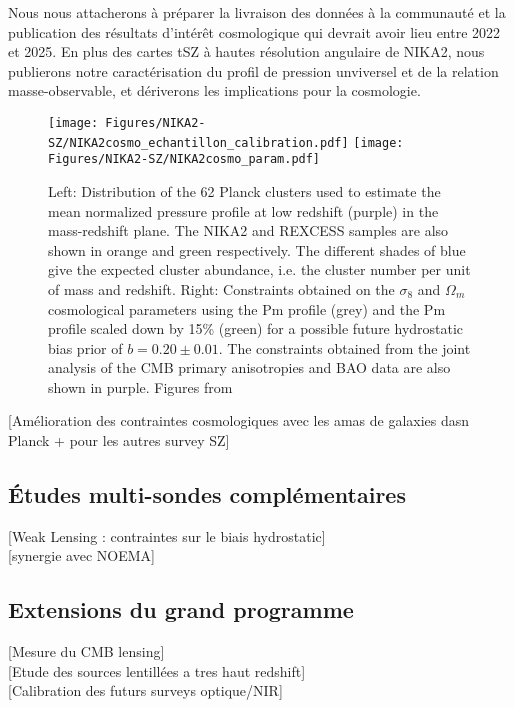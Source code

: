 Nous nous attacherons à préparer la livraison des données à la
communauté et la publication des résultats d'intérêt cosmologique qui
devrait avoir lieu entre 2022 et 2025. En plus des cartes tSZ à hautes
résolution angulaire de NIKA2, nous publierons notre caractérisation
du profil de pression unviversel et de la relation masse-observable,
et dériverons les implications pour la cosmologie.
%
\begin{figure}
  \centering
  \texttt{[image: Figures/NIKA2-SZ/NIKA2cosmo\_echantillon\_calibration.pdf]}
  \texttt{[image: Figures/NIKA2-SZ/NIKA2cosmo\_param.pdf]}
  \caption{Left: Distribution of the 62 Planck clusters used to
    estimate the mean normalized pressure profile at low redshift
    (purple) in the mass-redshift plane. The NIKA2 and REXCESS samples
    are also shown in orange and green respectively.
    The different shades of blue give the expected cluster abundance,
i.e. the cluster number per unit of mass and redshift. Right:
Constraints obtained on the $\sigma_8$ and $\Omega_m$ cosmological
parameters using the Pm profile (grey) and the Pm profile scaled down
by 15\% (green) for a possible future hydrostatic bias prior of $b = 0.20
\pm 0.01$. The constraints obtained from the joint analysis of the CMB
primary anisotropies and BAO data are also shown in purple. Figures
from~\citet{Ruppin2019b}}
  \label{fig:nika2cosmo}
\end{figure}
%

[Amélioration des contraintes cosmologiques avec les amas de galaxies
  dasn Planck + pour les autres survey SZ]\\

\subsection{\'Etudes multi-sondes complémentaires}

[Weak Lensing : contraintes sur le biais hydrostatic]\\

[synergie avec NOEMA]\\

\subsection{Extensions du grand programme}

[Mesure du CMB lensing]\\

[Etude des sources lentillées a tres haut redshift]\\

[Calibration des futurs surveys optique/NIR]\\
